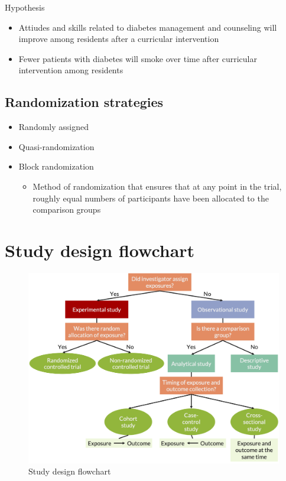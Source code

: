 \documentclass[
]{book}
\providecommand{\tightlist}{%
  \setlength{\itemsep}{0pt}\setlength{\parskip}{0pt}}
\begin{document}
Hypothesis

\begin{itemize}
\tightlist
\item
  Attiudes and skills related to diabetes management and counseling will improve among residents after a curricular intervention
\item
  Fewer patients with diabetes will smoke over time after curricular intervention among residents
\end{itemize}

\hypertarget{randomization-strategies}{%
\subsection{Randomization strategies}\label{randomization-strategies}}

\begin{itemize}
\tightlist
\item
  Randomly assigned
\item
  Quasi-randomization
\item
  Block randomization

  \begin{itemize}
  \tightlist
  \item
    Method of randomization that ensures that at any point in the trial, roughly equal numbers of participants have been allocated to the comparison groups
  \end{itemize}
\end{itemize}

\hypertarget{study-design-flowchart}{%
\section{Study design flowchart}\label{study-design-flowchart}}

\begin{figure}

{\centering \includegraphics[width=1\linewidth]{img/study_design/study_design_flowchart} 

}

\caption{Study design flowchart}\label{fig:unnamed-chunk-9}
\end{figure}
\end{document}
